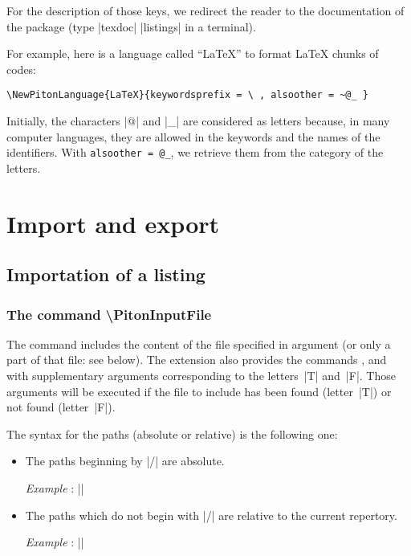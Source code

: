 \documentclass{article}
\begin{document}
For the description of those keys, we redirect the reader to the documentation
of the package  (type |texdoc| |listings| in a terminal). 

\bigskip
For example, here is a language called ``LaTeX'' to format LaTeX chunks of codes:

\begin{Verbatim}
\NewPitonLanguage{LaTeX}{keywordsprefix = \ , alsoother = ~@_ }
\end{Verbatim}

Initially, the characters |@| and |_| are considered as letters because, in
many computer languages, they are allowed in the keywords and the names of
the identifiers. With \verb|alsoother = @_|, we retrieve them from the
category of the letters. 

\section{Import and export}


\subsection{Importation of a listing}

\label{PitonInputFile}

\subsubsection{The command \textbackslash PitonInputFile}


The command  includes the content of the
file specified in argument (or only a part of that file: see below). The
extension  also provides the commands
,  and
 with supplementary arguments
corresponding to the letters~|T| and~|F|. Those arguments will be executed if
the file to include has been found (letter~|T|) or not found (letter~|F|).

\smallskip
The syntax for the paths (absolute or relative) is the following one:
\begin{itemize}
\item The paths beginning by |/| are absolute.

\emph{Example} : ||

\item The paths which do not begin with |/| are relative to the current
repertory. 

\emph{Example} : ||
\end{itemize}
\end{document}
